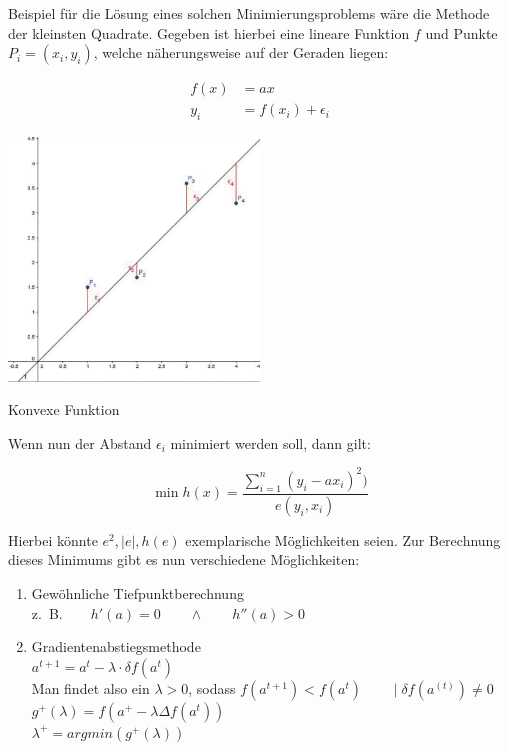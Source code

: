 \begin{Thm}
Beispiel für die Lösung eines solchen Minimierungsproblems wäre die Methode der kleinsten Quadrate. Gegeben ist hierbei eine lineare Funktion $f$ und Punkte $P_i=(x_i,y_i)$, welche näherungsweise auf der Geraden liegen:

\begin{align*}
f(x) &= ax \\
y_i &= f(x_i) + \epsilon_{i}
\end{align*}

\begin{dsafigure}
\begin{center}
\includegraphics[width=0.5\textwidth]{Grafik-OptimierungLennart_LineareRegression.pdf}
\caption{Konvexe Funktion}
\label{figure:Grafik-OptimierungLennart_LineareRegression.pdf}
\end{center}
\end{dsafigure}

Wenn nun der Abstand $\epsilon_i$ minimiert werden soll, dann gilt:

\begin{equation*}
\min h(x)=\frac{\sum_{i=1}^n(y_i-ax_i)^2)}{e(y_i,x_i)}
\end{equation*}

Hierbei könnte $e^2,\mid e\mid, h(e)$ exemplarische Möglichkeiten seien. Zur Berechnung dieses Minimums gibt es nun verschiedene Möglichkeiten:

\begin{enumerate}
\item Gewöhnliche Tiefpunktberechnung \\
z.~B.$\qquad h'(a)=0\qquad \wedge\qquad h''(a)>0$
\item Gradientenabstiegsmethode \\
$a^{t+1}  =a^{t} - \lambda \cdot \delta f(a^{t})$ \\
Man findet also ein $\lambda > 0$, sodass
$f(a^{t+1}) < f(a^{t})  \qquad \mid \delta f(a^{(t)}) \neq 0$ \\
$g^{+}(\lambda)=f(a^+-\lambda\Delta f(a^t))$ \\
$\lambda^+=argmin(g^+(\lambda))$
\end{enumerate}

\end{Thm}

